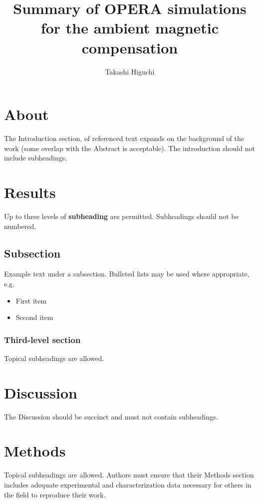 \documentclass[fleqn,10pt]{wlscirep}
\title{Summary of OPERA simulations for the ambient magnetic compensation}
\author[1]{Takashi Higuchi}
\affil[1]{\href{mailto:thiguchi@rcnp.osaka-u.ac.jp}{thiguchi@rcnp.osaka-u.ac.jp}}
\begin{document}
\flushbottom
\maketitle


\thispagestyle{empty}


\section{About}

The Introduction section, of referenced text\cite{Figueredo:2009dg} expands on the background of the work (some overlap with the Abstract is acceptable). The introduction should not include subheadings.

\section*{Results}

Up to three levels of \textbf{subheading} are permitted. Subheadings should not be numbered.

\subsection*{Subsection}

Example text under a subsection. Bulleted lists may be used where appropriate, e.g.

\begin{itemize}
\item First item
\item Second item
\end{itemize}

\subsubsection*{Third-level section}
 
Topical subheadings are allowed.

\section*{Discussion}

The Discussion should be succinct and must not contain subheadings.

\section*{Methods}

Topical subheadings are allowed. Authors must ensure that their Methods section includes adequate experimental and characterization data necessary for others in the field to reproduce their work.
\end{document}
